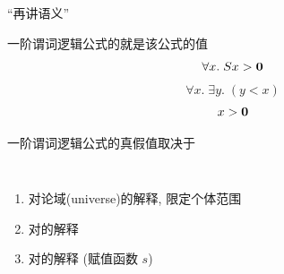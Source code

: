 
\begin{frame}{}
  \begin{center}
    {\Large ``再讲语义''}

    \vspace{0.30cm}
  \end{center}
\end{frame}

\begin{frame}{}
  \begin{center}
    一阶谓词逻辑公式的就是该公式的值
    \[
      \forall x.\; Sx > {\bf 0}
    \]
    \[
      \forall x.\; \exists y.\; (y < x)
    \]
    \[
      x > {\bf 0}
    \]

    \pause
    \vspace{0.60cm}
    一阶谓词逻辑公式的真假值取决于
    \begin{columns}
        \begin{enumerate}[(1)]
          \setlength{\itemsep}{6pt}
          \item 对论域(universe)的解释, 限定个体范围
          \item 对的解释
          \item 对的解释 (赋值函数 $s$)
        \end{enumerate}
    \end{columns}

    \pause
    \vspace{0.60cm}
  \end{center}
\end{frame}

